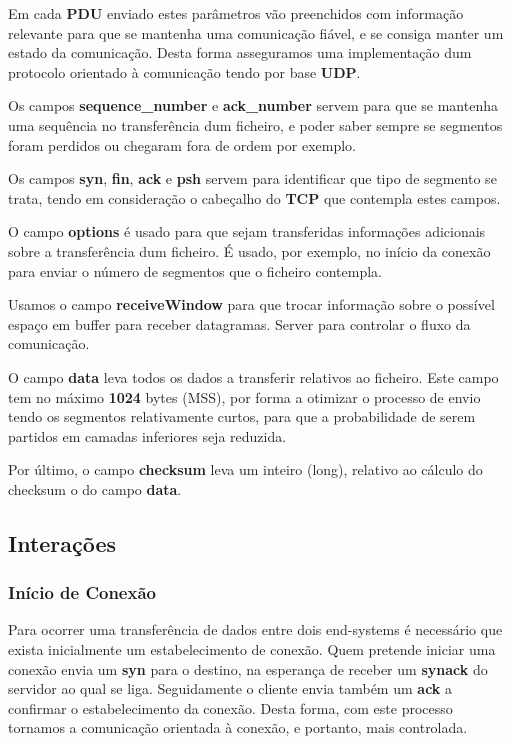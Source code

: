 \documentclass{llncs}
\begin{document}
Em cada \textbf{PDU} enviado estes parâmetros vão preenchidos com informação relevante para que se mantenha uma comunicação fiável, e se consiga manter um estado da comunicação. Desta forma asseguramos uma implementação dum protocolo orientado à comunicação tendo por base \textbf{UDP}.

Os campos \textbf{sequence\_number} e \textbf{ack\_number} servem para que se mantenha uma sequência no transferência dum ficheiro, e poder saber sempre se segmentos foram perdidos ou chegaram fora de ordem por exemplo.

Os campos \textbf{syn}, \textbf{fin}, \textbf{ack} e \textbf{psh} servem para identificar que tipo de segmento se trata, tendo em consideração o cabeçalho do \textbf{TCP} que contempla estes campos.

O campo \textbf{options} é usado para que sejam transferidas informações adicionais sobre a transferência dum ficheiro. É usado, por exemplo, no início da conexão para enviar o número de segmentos que o ficheiro contempla.

Usamos o campo \textbf{receiveWindow} para que trocar informação sobre o possível espaço em buffer para receber datagramas. Server para controlar o fluxo da comunicação.

O campo \textbf{data} leva todos os dados a transferir relativos ao ficheiro. Este campo tem no máximo \textbf{1024} bytes (MSS), por forma a otimizar o processo de envio tendo os segmentos relativamente curtos, para que a probabilidade de serem partidos em camadas inferiores seja reduzida.

Por último, o campo \textbf{checksum} leva um inteiro (long), relativo ao cálculo do checksum o do campo \textbf{data}.


\subsection{Interações}

\subsubsection{Início de Conexão}

\hspace{20.0cm}

Para ocorrer uma transferência de dados entre dois end-systems é necessário que exista inicialmente um estabelecimento de conexão. Quem pretende iniciar uma conexão envia um \textbf{syn} para o destino, na esperança de receber um \textbf{synack} do servidor ao qual se liga. Seguidamente o cliente envia também um \textbf{ack} a confirmar o estabelecimento da conexão. Desta forma, com este processo tornamos a comunicação orientada à conexão, e portanto, mais controlada.
\end{document}
